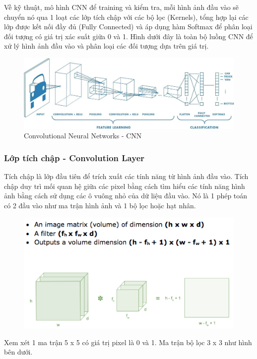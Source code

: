 Về kỹ thuật, mô hình CNN để training và kiểm tra, mỗi hình ảnh đầu vào sẽ chuyển nó qua 1 loạt các lớp tích chập với các bộ lọc (Kernels), tổng hợp lại các lớp được kết nối đầy đủ (Fully Connected) và áp dụng hàm Softmax để phân loại đối tượng có giá trị xác suất giữa 0 và 1. Hình dưới đây là toàn bộ luồng CNN để xử lý hình ảnh đầu vào và phân loại các đối tượng dựa trên giá trị. 

\begin{figure}[H]  %
    \centering
    \includegraphics[width=0.75\linewidth]{Chapter2/CNN.jpg}
    \caption{Convolutional Neural Networks - CNN}
    \label{fig:baitoan}
\end{figure}

\subsubsection{Lớp tích chập - Convolution Layer}

Tích chập là lớp đầu tiên để trích xuất các tính năng từ hình ảnh đầu vào. Tích chập duy trì mối quan hệ giữa các pixel bằng cách tìm hiểu các tính năng hình ảnh bằng cách sử dụng các ô vuông nhỏ của dữ liệu đầu vào. Nó là 1 phép toán có 2 đầu vào như ma trận hình ảnh và 1 bộ lọc hoặc hạt nhân.

\begin{figure}[H]  %
    \centering
    \includegraphics[width=0.75\linewidth]{Chapter2/CNN2.png}
    \label{fig:baitoan}
\end{figure}

Xem xét 1 ma trận 5 x 5 có giá trị pixel là 0 và 1. Ma trận bộ lọc 3 x 3 như hình bên dưới.

